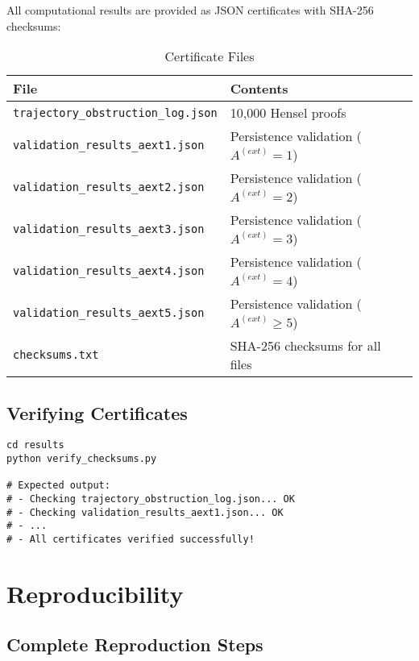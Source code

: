 \documentclass[11pt,a4paper]{article}
\newcommand{\file}[1]{\texttt{#1}}
\begin{document}
All computational results are provided as JSON certificates with SHA-256 checksums:

\begin{table}[H]
\centering
\caption{Certificate Files}
\begin{tabular}{@{}lp{6cm}@{}}
\toprule
\textbf{File} & \textbf{Contents} \\
\midrule
\file{trajectory\_obstruction\_log.json} & 10,000 Hensel proofs \\
\file{validation\_results\_aext1.json} & Persistence validation ($A^{(ext)} = 1$) \\
\file{validation\_results\_aext2.json} & Persistence validation ($A^{(ext)} = 2$) \\
\file{validation\_results\_aext3.json} & Persistence validation ($A^{(ext)} = 3$) \\
\file{validation\_results\_aext4.json} & Persistence validation ($A^{(ext)} = 4$) \\
\file{validation\_results\_aext5.json} & Persistence validation ($A^{(ext)} \geq 5$) \\
\file{checksums.txt} & SHA-256 checksums for all files \\
\bottomrule
\end{tabular}
\end{table}

\subsection{Verifying Certificates}

\begin{lstlisting}[style=bashstyle, caption={Verify All Certificates}]
cd results
python verify_checksums.py

# Expected output:
# - Checking trajectory_obstruction_log.json... OK
# - Checking validation_results_aext1.json... OK
# - ...
# - All certificates verified successfully!
\end{lstlisting}

\section{Reproducibility}

\subsection{Complete Reproduction Steps}
\end{document}
